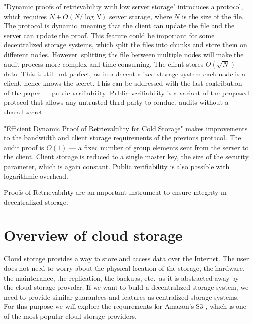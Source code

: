 "Dynamic proofs of retrievability with low server storage" introduces a protocol, which 
requires $N + O(N/\log N)$ server storage, where $N$ is the size of the file.
The protocol is dynamic, meaning that the client can update the file and the server can update the proof.
This feature could be important for some decentralized storage systems, which split the files into chunks and
store them on different nodes.
However, splitting the file between multiple nodes will make the audit process more complex and time-consuming.
The client stores $O(\sqrt{N})$ data.
This is still not perfect, as in a decentralized storage system each node is a client, hence knows the secret.
This can be addressed with the last contribution of the paper --- public verifiability.
Public verifiability is a variant of the proposed protocol that allows any untrusted third party
to conduct audits without a shared secret.

"Efficient Dynamic Proof of Retrievability for Cold Storage" makes improvements to the bandwidth and
client storage requirements of the previous protocol.
The audit proof is $O(1)$ --- a fixed number of group elements sent from the server to the client.
Client storage is reduced to a single master key, the size of the security parameter,
which is again constant.
Public verifiability is also possible with logarithmic overhead.

Proofs of Retrievability are an important instrument to ensure integrity in decentralized storage.

\label{section:cloud}
\section{Overview of cloud storage}

Cloud storage provides a way to store and access data over the Internet.
The user does not need to worry about the physical location of the storage, the hardware, the maintenance,
the replication, the backups, etc., as it is abstracted away by the cloud storage provider.
If we want to build a decentralized storage system, we need to provide similar guarantees and features
as centralized storage systems.
For this purpose we will explore the requirements for Amazon's S3 \cite{s3-faq},
which is one of the most popular cloud storage providers.

